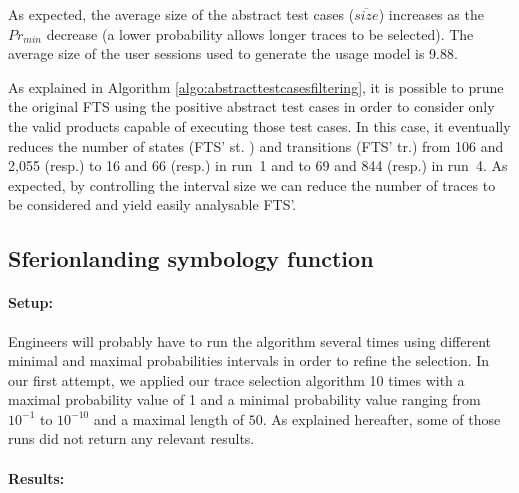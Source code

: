 As expected, the average size of the abstract test cases ($\overline{size}$) increases as the $Pr_{min}$ decrease (a lower probability allows longer traces to be selected). The average size of the user sessions used to generate the usage model is 9.88.

As explained in Algorithm \ref{algo:abstracttestcasesfiltering}, it is possible to prune the original FTS using the positive abstract test cases in order to consider only the valid products capable of executing those test cases. In this case, it eventually reduces the number of states (FTS' st.	) and transitions (FTS' tr.) from 106 and 2,055 (resp.) to 16 and 66 (resp.) in run~1 and to 69 and 844 (resp.) in run~4. As expected, by controlling the interval size we can reduce the number of traces to be considered and yield easily analysable FTS'.


\subsection{Sferion\texttrademark landing symbology function}

\paragraph{Setup:}

Engineers will probably have to run the algorithm several times using different minimal and maximal probabilities intervals in order to refine the selection. In our first attempt, we applied our trace selection algorithm 10 times with a maximal probability value of 1 and a minimal probability value ranging from $10^{-1}$ to $10^{-10}$ and a maximal length of $50$. As explained hereafter, some of those runs did not return any relevant results.


\paragraph{Results:}

